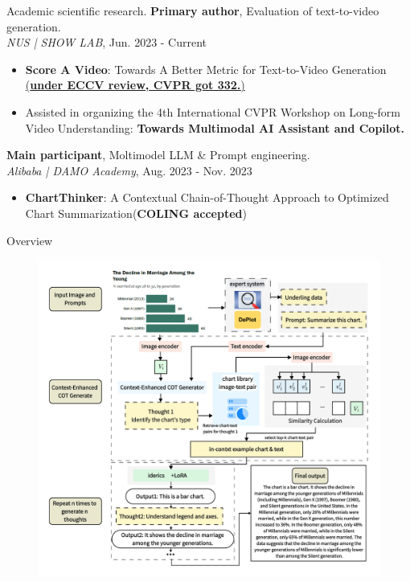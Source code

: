 \documentclass[8pt]{beamer}
\begin{document}
\begin{frame}{Academic scientific research.}
\textbf{Primary author}, Evaluation of text-to-video generation.\\
\textit{NUS | SHOW LAB}, Jun. 2023 - Current
\begin{itemize}
\item \textbf{Score A Video}: Towards A Better Metric for Text-to-Video Generation\\\href{https://showlab.github.io/T2VScore/}{(\textbf{under ECCV review, CVPR got 332.})}
\item Assisted in organizing the 4th International CVPR Workshop on Long-form Video Understanding: \textbf{Towards Multimodal AI Assistant and Copilot.}
\end{itemize}
\textbf{Main participant}, Moltimodel LLM \& Prompt engineering.\\
\textit{Alibaba | DAMO Academy}, Aug. 2023 - Nov. 2023
\begin{itemize}
\item \textbf{ChartThinker}: A Contextual Chain-of-Thought Approach to Optimized Chart Summarization(\textbf{COLING accepted})
\end{itemize}

\end{frame}
\begin{frame}{Overview}
 \begin{figure}[h]
        \begin{minipage}{0.35\textwidth}
            \centering
        \end{minipage}\hfill
        \begin{minipage}{0.48\textwidth}
            \centering
            \includegraphics[width=\linewidth]{demo/model.pdf}
        \end{minipage}
    \end{figure}
\end{frame}
\end{document}
